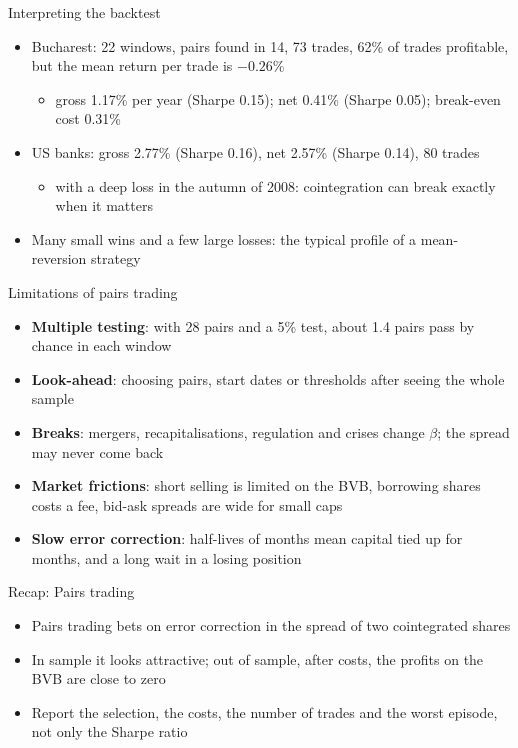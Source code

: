 \begin{frame}{Interpreting the backtest}
\itemsize{\small}
\begin{itemize}
    \item Bucharest: 22 windows, pairs found in 14, 73 trades, 62\% of trades profitable, but the mean return per trade is $-0.26$\%
    \begin{itemize}
        \item gross 1.17\% per year (Sharpe 0.15); net 0.41\% (Sharpe 0.05); break-even cost 0.31\%
    \end{itemize}
    \item US banks: gross 2.77\% (Sharpe 0.16), net 2.57\% (Sharpe 0.14), 80 trades
    \begin{itemize}
        \item with a deep loss in the autumn of 2008: cointegration can break exactly when it matters
    \end{itemize}
    \item Many small wins and a few large losses: the typical profile of a mean-reversion strategy
\end{itemize}
\end{frame}

\begin{frame}{Limitations of pairs trading}
\itemsize{\small}
\begin{itemize}
    \item \textbf{Multiple testing}: with 28 pairs and a 5\% test, about 1.4 pairs pass by chance in each window
    \item \textbf{Look-ahead}: choosing pairs, start dates or thresholds after seeing the whole sample
    \item \textbf{Breaks}: mergers, recapitalisations, regulation and crises change $\beta$; the spread may never come back
    \item \textbf{Market frictions}: short selling is limited on the BVB, borrowing shares costs a fee, bid-ask spreads are wide for small caps
    \item \textbf{Slow error correction}: half-lives of months mean capital tied up for months, and a long wait in a losing position
\end{itemize}
\end{frame}

\begin{frame}{Recap: Pairs trading}
\itemsize{\small}
\begin{itemize}
    \item Pairs trading bets on error correction in the spread of two cointegrated shares
    \item In sample it looks attractive; out of sample, after costs, the profits on the BVB are close to zero
    \item Report the selection, the costs, the number of trades and the worst episode, not only the Sharpe ratio
\end{itemize}
\end{frame}


